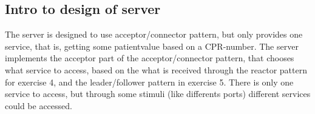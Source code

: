 \documentclass[Main]{subfiles}
\begin{document}
\subsection{Intro to design of server}
The server is designed to use acceptor/connector pattern, but only provides one service, that is, getting some patientvalue based on a CPR-number.
The server implements the acceptor part of the acceptor/connector pattern, that chooses what service to access, based on the what is received through the reactor pattern for exercise 4, and the leader/follower pattern in exercise 5. There is only one service to access, but through some stimuli (like differents ports) different services could be accessed.
\end{document}
